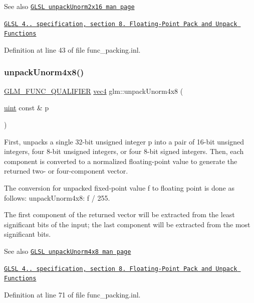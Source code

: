 \begin{DoxySeeAlso}{See also}
\href{http://www.opengl.org/sdk/docs/manglsl/xhtml/unpackUnorm2x16.xml}{\tt G\+L\+SL unpack\+Unorm2x16 man page} 

\href{http://www.opengl.org/registry/doc/GLSLangSpec.4.20.8.pdf}{\tt G\+L\+SL 4.. specification, section 8. Floating-\/\+Point Pack and Unpack Functions} 
\end{DoxySeeAlso}


Definition at line 43 of file func\+\_\+packing.\+inl.

\mbox{\label{group__core__func__packing_ga5d3c4d354b48a317935349dd62a8b8a5}} 
\subsubsection{\texorpdfstring{unpack\+Unorm4x8()}{unpackUnorm4x8()}}
{\footnotesize\ttfamily \hyperlink{setup_8hpp_a33fdea6f91c5f834105f7415e2a64407}{G\+L\+M\+\_\+\+F\+U\+N\+C\+\_\+\+Q\+U\+A\+L\+I\+F\+I\+ER} \hyperlink{group__core__types_ga5881b1b022d7fd1b7218f5916532dd02}{vec4} glm\+::unpack\+Unorm4x8 (\begin{DoxyParamCaption}\item[{\hyperlink{group__core__precision_ga4fd29415871152bfb5abd588334147c8}{uint} const \&}]{p }\end{DoxyParamCaption})}

First, unpacks a single 32-\/bit unsigned integer p into a pair of 16-\/bit unsigned integers, four 8-\/bit unsigned integers, or four 8-\/bit signed integers. Then, each component is converted to a normalized floating-\/point value to generate the returned two-\/ or four-\/component vector.

The conversion for unpacked fixed-\/point value f to floating point is done as follows\+: unpack\+Unorm4x8\+: f / 255.

The first component of the returned vector will be extracted from the least significant bits of the input; the last component will be extracted from the most significant bits.

\begin{DoxySeeAlso}{See also}
\href{http://www.opengl.org/sdk/docs/manglsl/xhtml/unpackUnorm4x8.xml}{\tt G\+L\+SL unpack\+Unorm4x8 man page} 

\href{http://www.opengl.org/registry/doc/GLSLangSpec.4.20.8.pdf}{\tt G\+L\+SL 4.. specification, section 8. Floating-\/\+Point Pack and Unpack Functions} 
\end{DoxySeeAlso}


Definition at line 71 of file func\+\_\+packing.\+inl.

